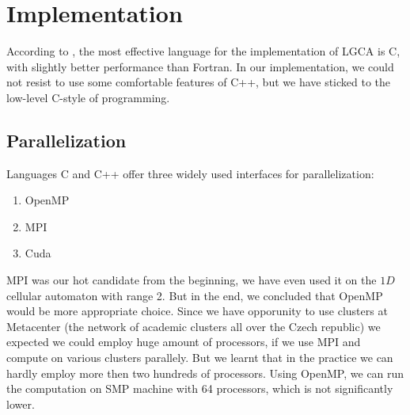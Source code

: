 \chapter{Implementation}

According to \cite{wolf}, the most effective language for the implementation of LGCA is C, with slightly better performance than Fortran.
In our implementation, we could not resist to use some comfortable features of C++, but we have sticked to the low-level C-style of programming.
\bigskip

%



\section{Parallelization}
Languages C and C++ offer three widely used interfaces for parallelization:
\begin{enumerate}
\item OpenMP
\item MPI
\item Cuda
\end{enumerate}
%

\bigskip

MPI was our hot candidate from the beginning, we have even used it on the $1D$ cellular automaton with range 2. 
But in the end, we concluded that OpenMP would be more appropriate choice.
Since we have opporunity to use clusters at Metacenter (the network of academic clusters all over the Czech republic) we expected we could employ huge amount of processors, if we use MPI and compute on various clusters parallely. But we learnt that in the practice we can hardly employ more then two hundreds of processors.
Using OpenMP, we can run the computation on SMP machine with 64 processors, which is not significantly lower.

